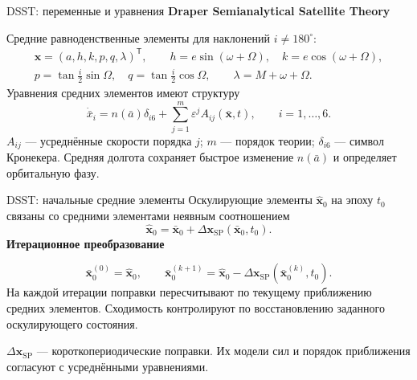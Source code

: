 \documentclass[11pt,aspectratio=169,t]{beamer}
\begin{document}
\begin{frame}{DSST: переменные и уравнения}
\setlength{\abovedisplayskip}{5pt}
\setlength{\belowdisplayskip}{5pt}
\setlength{\abovedisplayshortskip}{0pt}
\setlength{\belowdisplayshortskip}{4pt}
\textbf{Draper Semianalytical Satellite Theory}\par
Средние равноденственные элементы для наклонений $i\ne180^\circ$:
\[
\begin{gathered}
\mathbf x=(a,h,k,p,q,\lambda)^{\mathsf T},\qquad
h=e\sin(\omega+\Omega),\quad k=e\cos(\omega+\Omega),\\
p=\tan\frac{i}{2}\sin\Omega,\quad q=\tan\frac{i}{2}\cos\Omega,
\qquad\lambda=M+\omega+\Omega.
\end{gathered}
\]
Уравнения средних элементов имеют структуру
\[
\dot{\bar x}_i=n(\bar a)\delta_{i6}
+\sum_{j=1}^{m}\varepsilon^j A_{ij}(\bar{\mathbf x},t),
\qquad i=1,\ldots,6.
\]
\justifying
$A_{ij}$ --- усреднённые скорости порядка $j$; $m$ --- порядок теории;
$\delta_{i6}$ --- символ Кронекера.
Средняя долгота сохраняет быстрое изменение $n(\bar a)$ и определяет орбитальную фазу.
\end{frame}

\begin{frame}{DSST: начальные средние элементы}
\setlength{\abovedisplayskip}{5pt}
\setlength{\belowdisplayskip}{5pt}
\setlength{\abovedisplayshortskip}{0pt}
\setlength{\belowdisplayshortskip}{4pt}
\justifying
Оскулирующие элементы $\hat{\mathbf x}_0$ на эпоху $t_0$ связаны со средними элементами неявным соотношением
\[
\hat{\mathbf x}_0=\bar{\mathbf x}_0
+\Delta\mathbf x_{\mathrm{SP}}(\bar{\mathbf x}_0,t_0).
\]
\medskip
\textbf{\color{courseaccent}Итерационное преобразование}\par
\[
\bar{\mathbf x}_0^{(0)}=\hat{\mathbf x}_0,
\qquad
\bar{\mathbf x}_0^{(k+1)}=\hat{\mathbf x}_0
-\Delta\mathbf x_{\mathrm{SP}}(\bar{\mathbf x}_0^{(k)},t_0).
\]
\justifying
На каждой итерации поправки пересчитывают по текущему приближению средних элементов. Сходимость контролируют по восстановлению заданного оскулирующего состояния.\par
\medskip
\justifying
$\Delta\mathbf x_{\mathrm{SP}}$ --- короткопериодические поправки. Их модели сил и порядок приближения согласуют с усреднёнными уравнениями.
\end{frame}
\end{document}
